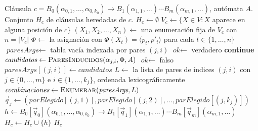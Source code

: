 \documentclass[11pt, letterpaper]{article}
\theoremstyle{definition}
\newcommand{\pair}[2]{\langle #1, #2 \rangle}
\begin{document}
\begin{algorithm}[H]
\caption{\textsc{ClausulasHeredadas}($c, A$)}
\begin{algorithmic}[1]
\Require Cláusula $c = B_0(\alpha_{0,1}, \dots, \alpha_{0, k_0}) \to B_1(\alpha_{1,1}, \dots) \cdots B_m(\alpha_{m,1}, \dots)$, autómata $A$.
\Ensure  Conjunto $H_c$ de cláusulas heredadas de $c$.
\State $H_c \gets \emptyset$
\State $V_c \gets \{X \in V : X$ aparece en alguna posición de $c\}$
\State $(X_1, X_2, \dots, X_n) \gets $ una enumeración fija de $V_c$ con $n = |V_c|$
\For{cada tupla $\tau = (\pair{p_1}{p'_1}, \dots, \pair{p_n}{p'_n}) \in (Q \times Q)^n$}
    \State $\Phi \gets$ la asignación con $\Phi(X_t) = \pair{p_t}{p'_t}$ para cada $t \in \{1, \dots, n\}$
    \State $\textit{paresArgs} \gets $ tabla vacía indexada por pares $(j, i)$
    \State $\textit{ok} \gets$ verdadero
                \State \textbf{continue}
            \EndIf
            \State $\textit{candidatos} \gets \textsc{ParesInducidos}(\alpha_{j,i}, \Phi, A)$
                \State $\textit{ok} \gets$ falso
            \Else
                \State $\textit{paresArgs}[(j, i)] \gets \textit{candidatos}$
            \EndIf
        \EndFor
    \EndFor
        \State $L \gets$ la lista de pares de índices $(j, i)$ con $j \in \{0, \dots, m\}$ e $i \in \{1, \dots, k_j\}$, ordenada lexicográficamente
        \State $\textit{combinaciones} \gets \textsc{Enumerar}(\textit{paresArgs}, L)$
                \State $\vec{q}_j \gets (\textit{parElegido}[(j, 1)], \textit{parElegido}[(j, 2)], \dots, \textit{parElegido}[(j, k_j)])$
            \EndFor
            \State $h \gets B_0[\vec{q}_0](\alpha_{0,1}, \dots, \alpha_{0, k_0}) \to B_1[\vec{q}_1](\alpha_{1,1}, \dots) \cdots B_m[\vec{q}_m](\alpha_{m,1}, \dots)$
            \State $H_c \gets H_c \cup \{h\}$
        \EndFor
    \EndIf
\EndFor
\State \Return $H_c$
\end{algorithmic}
\end{algorithm}
\end{document}

